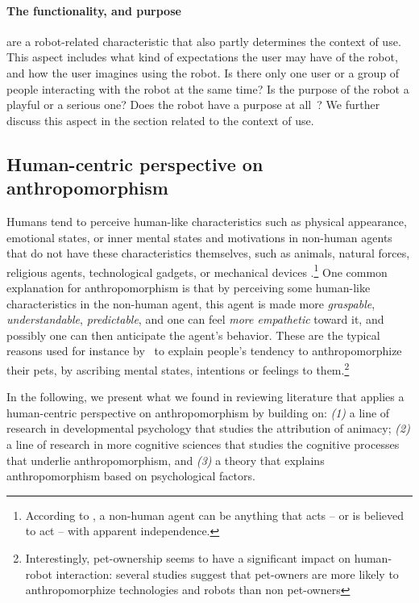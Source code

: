 \documentclass{frontiersSCNS} %
\begin{document}
\paragraph{The functionality, and purpose} are a robot-related characteristic
that also partly determines the context of use. This aspect includes what kind
of expectations the user may have of the robot, and how the user imagines using
the robot. Is there only one user or a group of people interacting with the
robot at the same time? Is the purpose of the robot a playful or a serious one?
Does the robot have a purpose at all~\citep{kaplan_free_2000}? We further
discuss this aspect in the section related to the context of use.


%
%
%
%
%
%

\subsection{Human-centric perspective on anthropomorphism}

Humans tend to perceive human-like characteristics such as physical appearance,
emotional states, or inner mental states and motivations in non-human agents
that do not have these characteristics themselves, such as animals, natural
forces, religious agents, technological gadgets, or mechanical devices
\citep{epley_when_2008}.\footnote{According to \citet{epley_when_2008}, a
non-human agent can be anything that acts -- or is believed to act -- with
apparent independence.} One common explanation for anthropomorphism is that by
perceiving some human-like characteristics in the non-human agent, this agent is
made more \emph{graspable}, \emph{understandable}, \emph{predictable}, and one
can feel \emph{more empathetic} toward it, and possibly one can then anticipate
the agent's behavior. These are the typical reasons used for instance
by~\citet{eddy_attribution_1993} to explain people's tendency to
anthropomorphize their pets, by ascribing mental states, intentions or feelings
to them.\footnote{Interestingly, pet-ownership seems to have a significant
impact on human-robot interaction: several studies suggest that pet-owners
are more likely to anthropomorphize technologies and robots than non
pet-owners} 

In the following, we present what we found in reviewing literature that applies
a human-centric perspective on anthropomorphism by building on: \textit{(1)} a
line of research in developmental psychology that studies the attribution of
animacy; \textit{(2)} a line of research in more cognitive sciences that studies
the cognitive processes that underlie anthropomorphism, and \textit{(3)} a
theory that explains anthropomorphism based on psychological factors. 
\end{document}
